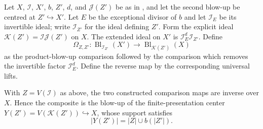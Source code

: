 \begin{definition}
  \label{def:nagata-composition-of-blowups-comparison}
  \leanok

  Let $X$, $\mathcal I$, $X'$, $b$, $Z'$, $d$, and $\mathcal J(Z')$ be as in
  , and let the second blow-up be
  centred at $Z'\hookrightarrow X'$.  Let $E$ be the exceptional divisor of
  $b$ and let $\mathcal I_E$ be its invertible ideal; write
  $\mathcal I_{Z'}$ for the ideal defining $Z'$.  Form the explicit ideal
  $\mathcal K(Z')=\mathcal I\mathcal J(Z')$ on $X$.  The extended ideal on
  $X'$ is $\mathcal I_E^d\mathcal I_{Z'}$.  Define
  \[
    \Omega_{Z,Z'}\colon
      \operatorname{Bl}_{\mathcal I_{Z'}}(X')
      \longrightarrow
      \operatorname{Bl}_{\mathcal K(Z')}(X)
  \]
  as the product-blow-up comparison followed by the comparison which removes
  the invertible factor $\mathcal I_E^d$.  Define the reverse map by the
  corresponding universal lifts.
\end{definition}

\begin{theorem}
  \label{thm:nagata-composition-of-blowups}
  \leanok

  With $Z=V(\mathcal I)$ as above, the two constructed comparison maps are
  inverse over $X$.  Hence the
  composite is the blow-up of the finite-presentation center
  $Y(Z')=V(\mathcal K(Z'))\hookrightarrow X$, whose support satisfies
  \[
    |Y(Z')|=|Z|\cup b(|Z'|).
  \]
\end{theorem}

